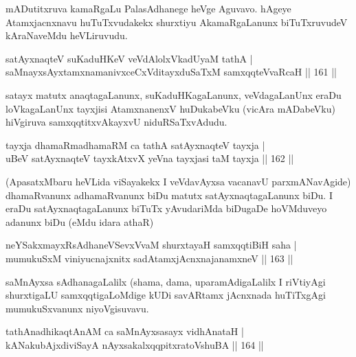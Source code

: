 \begin{artha}%
mADutitxruva kamaRgaLu PalasAdhanege heVge Aguvavo. hAgeye Atamxjacnxnavu huTuTxvudakekx shurxtiyu AkamaRgaLanunx biTuTxruvudeV kAraNaveMdu heVLiruvudu.
\end{artha}


\begin{shl}
satAyxnaqteV suKaduHKeV veVdAlolxVkadUyaM tathA |\\
saMnayxsAyx\s \s tamxnamanivxceCxVditayxduSaTxM samxqqteVvaRcaH \hfill || 161 ||
\end{shl}

\begin{artha}
satayx matutx anaqtagaLanunx, suKaduHKagaLanunx, veVdagaLanUnx eraDu loVkagaLanUnx tayxjisi AtamxnanenxV huDukabeVku (vicAra mADabeVku) hiVgiruva samxqqtitxvAkayxvU niduRSaTxvAdudu.
\end{artha}

\begin{shl}
tayxja dhamaRmadhamaRM ca tathA satAyxnaqteV tayxja |\\
uBeV satAyxnaqteV tayxkAtxvX yeVna tayxjasi taM tayxja \hfill || 162 ||
\end{shl}

\begin{artha}
(ApasatxMbaru heVLida viSayakekx I veVdavAyxsa vacanavU parxmANavAgide) dhamaRvanunx adhamaRvanunx biDu matutx satAyxnaqtagaLanunx biDu. I eraDu satAyxnaqtagaLanunx biTuTx yAvudariMda biDugaDe hoVMduveyo adanunx biDu (eMdu idara athaR) 
\end{artha}

\begin{shl}
neYSakxmayxRsAdhaneVSevxVvaM shurxtayaH samxqqtiBiH saha |\\
mumukuSxM viniyucnajxnitx sadA\s \s tamxjAcnxnajanamxneV \hfill || 163 ||
\end{shl}

\begin{artha}
saMnAyxsa sAdhanagaLalilx (shama, dama, uparamAdigaLalilx I riVtiyAgi shurxtigaLU samxqqtigaLoMdige kUDi savARtamx jAcnxnada huTiTxgAgi mumukuSxvanunx niyoVgisuvavu.
\end{artha}


\begin{shl}
tathA\s nadhikaqtAnAM ca saMnAyxsasayx vidhAnataH |\\
kANakubAjxdiviSayA nAyxsakalxqqpitxratoV\s shuBA \hfill || 164 ||
\end{shl}


